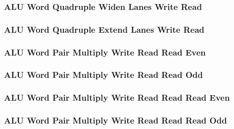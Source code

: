 \subsubsection[{\small ALU Word Quadruple Widen Lanes Write Read}]{ALU Word Quadruple Widen Lanes Write Read} \label{sec:format-ALU-WQWIDEWR}



\subsubsection[{\small ALU Word Quadruple Extend Lanes Write Read}]{ALU Word Quadruple Extend Lanes Write Read} \label{sec:format-ALU-WQEXTLWR}



\subsubsection[{\small ALU Word Pair Multiply Write Read Read Even}]{ALU Word Pair Multiply Write Read Read Even} \label{sec:format-ALU-WPMWRRE}



\subsubsection[{\small ALU Word Pair Multiply Write Read Read Odd}]{ALU Word Pair Multiply Write Read Read Odd} \label{sec:format-ALU-WPMWRRO}



\subsubsection[{\small ALU Word Pair Multiply Write Read Read Read Even}]{ALU Word Pair Multiply Write Read Read Read Even} \label{sec:format-ALU-WPMWRRRE}



\subsubsection[{\small ALU Word Pair Multiply Write Read Read Read Odd}]{ALU Word Pair Multiply Write Read Read Read Odd} \label{sec:format-ALU-WPMWRRRO}

